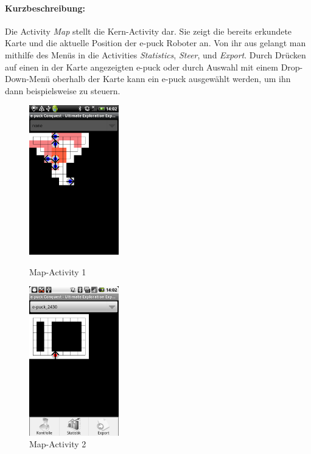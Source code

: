 \documentclass[10pt,a4paper]{article}
\begin{document}
 		\paragraph{Kurzbeschreibung:}
 		Die Activity \textit{Map} stellt die Kern-Activity dar. Sie zeigt die bereits erkundete Karte und die aktuelle Position der e-puck Roboter an. Von ihr aus gelangt man
 		mithilfe des Men\"us in die Activities \textit{Statistics}, \textit{Steer}, und \textit{Export}. Durch Dr\"ucken auf einen in der Karte angezeigten e-puck oder durch 
 		Auswahl mit einem Drop-Down-Men\"u oberhalb der Karte kann ein e-puck ausgew\"ahlt werden, um ihn dann beispielsweise zu steuern.
 		\begin{figure}[htbp]
				\begin{minipage}[t]{6cm}
					\vspace{10pt}
					\includegraphics[height=6.5cm]{images/map.png} 
					\caption{Map-Activity 1}
				\end{minipage}
				\hfill
				\begin{minipage}[t]{6cm}
					\vspace{10pt}
					\includegraphics[height=6.5cm]{images/map2.png} 
					\caption{Map-Activity 2}
				\end{minipage}
   			\end{figure} 	 			
 		
\end{document}
